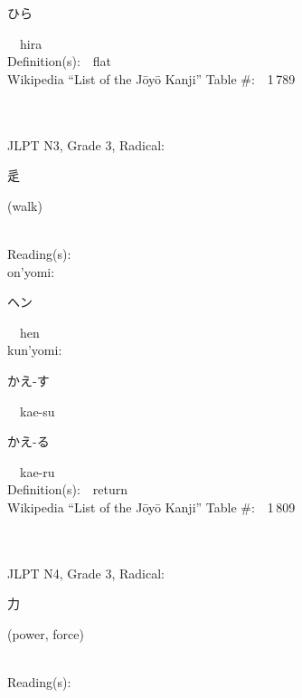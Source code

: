 \begin{multicols}{2}
{\hspace*{2em}}{\begin{CJK}{UTF8}{min} ひら \end{CJK}}\ \ hira\ \ \\
Definition(s):\ \ flat \\
Wikipedia ``List of the J\=oy\=o Kanji'' Table \#:\ \ 1\,789 \\
\ \ \\
{\fontsize{34pt}{40pt}  }\ \ \\  %
{JLPT N3, Grade 3, Radical:\ \ {\begin{CJK}{UTF8}{min} 辵 \end{CJK}} (walk) } \\
Reading(s):\ \ \\
{\hspace*{1em}}on'yomi:\ \ \\
{\hspace*{2em}}{\begin{CJK}{UTF8}{min} ヘン \end{CJK}}\ \ hen\ \ \\
{\hspace*{1em}}kun'yomi:\ \ \\
{\hspace*{2em}}{\begin{CJK}{UTF8}{min} かえ-す \end{CJK}}\ \ kae-su\ \ \\
{\hspace*{2em}}{\begin{CJK}{UTF8}{min} かえ-る \end{CJK}}\ \ kae-ru\ \ \\
Definition(s):\ \ return \\
Wikipedia ``List of the J\=oy\=o Kanji'' Table \#:\ \ 1\,809 \\
\ \ \\
{\fontsize{34pt}{40pt}  }\ \ \\  %
{JLPT N4, Grade 3, Radical:\ \ {\begin{CJK}{UTF8}{min} 力 \end{CJK}} (power, force) } \\
Reading(s):\ \ \\

\end{multicols}
